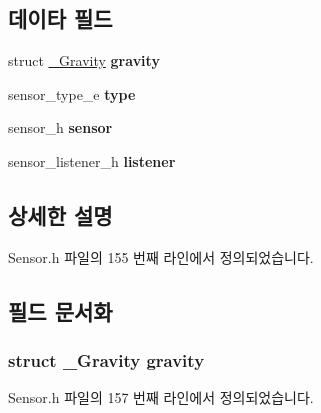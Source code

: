 \subsection*{데이타 필드}
\begin{DoxyCompactItemize}
\item 
\hypertarget{struct___gravity_extend_ae4623ab137188f79a517066e08032746}{struct \hyperlink{struct___gravity}{\-\_\-\-Gravity} {\bfseries gravity}}\label{struct___gravity_extend_ae4623ab137188f79a517066e08032746}

\item 
\hypertarget{struct___gravity_extend_abffb09766da2fc510a79bb51f82a36e1}{sensor\-\_\-type\-\_\-e {\bfseries type}}\label{struct___gravity_extend_abffb09766da2fc510a79bb51f82a36e1}

\item 
\hypertarget{struct___gravity_extend_a5bae9b7801bc3808411925cde81d3f26}{sensor\-\_\-h {\bfseries sensor}}\label{struct___gravity_extend_a5bae9b7801bc3808411925cde81d3f26}

\item 
\hypertarget{struct___gravity_extend_aa977dfb866b24fd7d9a20a9a01b2fd1f}{sensor\-\_\-listener\-\_\-h {\bfseries listener}}\label{struct___gravity_extend_aa977dfb866b24fd7d9a20a9a01b2fd1f}

\end{DoxyCompactItemize}


\subsection{상세한 설명}


Sensor.\-h 파일의 155 번째 라인에서 정의되었습니다.



\subsection{필드 문서화}
\hypertarget{struct___gravity_extend_ae4623ab137188f79a517066e08032746}{
\subsubsection[{gravity}]{\setlength{\rightskip}{0pt plus 5cm}struct {\bf \-\_\-\-Gravity} gravity}}\label{struct___gravity_extend_ae4623ab137188f79a517066e08032746}


Sensor.\-h 파일의 157 번째 라인에서 정의되었습니다.


